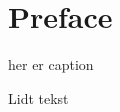 \documentclass{ermreport}
\begin{document}
\ermFront

\chapter{Preface}


\begin{boks}
\caption{her er caption}
Lidt tekst
\end{boks}
\end{document}
